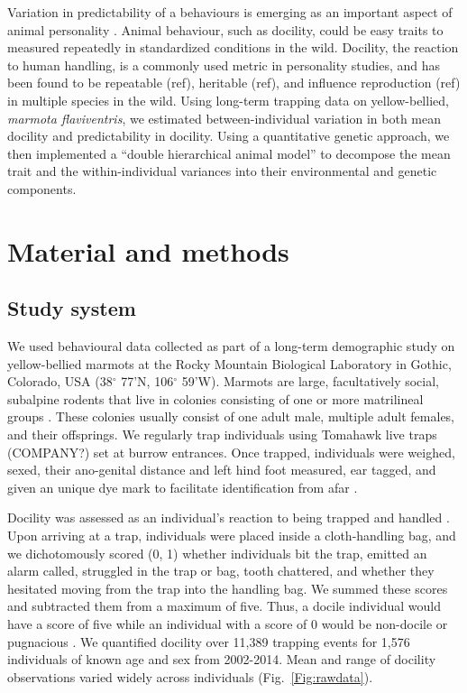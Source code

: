 \documentclass[a4paper,12pt,twoside]{article}
\begin{document}
	
	Variation in predictability of a behaviours is emerging as an important aspect of animal personality \citep{stamps_unpredictable_2012,cleasby_quantifying_2015,westneat_biology_2015}.
	Animal behaviour, such as docility, could be easy traits to measured repeatedly in standardized conditions in the wild.
	Docility, the reaction to human handling, is a commonly used metric in personality studies, and has been found to be repeatable (ref), heritable (ref), and influence reproduction (ref) in multiple species in the wild. 
	Using long-term trapping data on yellow-bellied, \textit{marmota flaviventris}, we estimated between-individual variation in both mean docility and predictability in docility.
	Using a quantitative genetic approach, we then implemented a “double hierarchical animal model” to decompose the mean trait and the within-individual variances into their environmental and genetic components.  

	\section*{Material and methods}
	\subsection*{Study system}
	We used behavioural data collected as part of a long-term demographic study on yellow-bellied marmots at the Rocky Mountain Biological Laboratory in Gothic, Colorado, USA (38$^{\circ}$ 77’N, 106$^{\circ}$ 59’W).
	Marmots are large, facultatively social, subalpine rodents that live in colonies consisting of one or more matrilineal groups \citep{frase_marmota_1980,armitage_marmot_2014}. 
	These colonies usually consist of one adult male, multiple adult females, and their offsprings. 
	We regularly trap individuals using Tomahawk live traps (COMPANY?) set at burrow entrances. 
	Once trapped, individuals were weighed, sexed, their ano-genital distance and left hind foot measured, ear tagged, and given an unique dye mark to facilitate identification from afar \citep{blumstein_test_2009}. 
	
	Docility was assessed as an individual’s reaction to being trapped and handled \citep{reale_integrating_2007,petelle_development_2013}.
	Upon arriving at a trap, individuals were placed inside a cloth-handling bag, and we dichotomously scored (0, 1) whether individuals bit the trap, emitted an alarm called, struggled in the trap or bag, tooth chattered, and whether they hesitated moving from the trap into the handling bag. 
	We summed these scores and subtracted them from a maximum of five. 
	Thus, a docile individual would have a score of five while an individual with a score of 0 would be non-docile or pugnacious \citep{reale_integrating_2007}. 
	We quantified docility over 11,389 trapping events for 1,576 individuals of known age and sex from 2002-2014. Mean and range of docility observations varied widely across individuals (Fig.~\ref{Fig:rawdata}).
	
\end{document}
